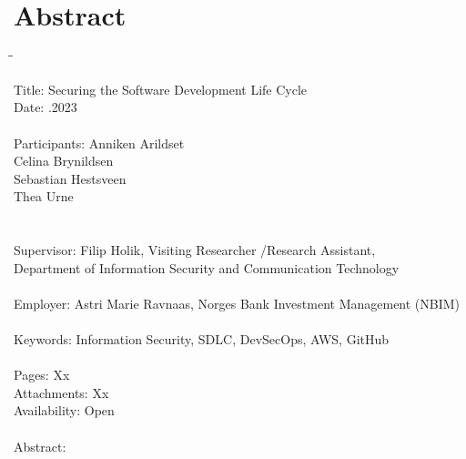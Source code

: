 
\chapter*{Abstract}

\begin{tabbing}
\hspace{2cm}\=\hspace{3cm}\=\kill %

Title: \> \> Securing the Software Development Life Cycle \\
Date: \> .2023 \\ 
\\
Participants: \> \> Anniken Arildset \\ \> \> Celina Brynildsen \\ \> \> Sebastian Hestsveen \\ \> \> Thea Urne \\
\\
\\
Supervisor: \> \> Filip Holik, Visiting Researcher /Research Assistant, \\\> \> Department of Information Security and Communication Technology \\
\\
Employer: \> \>  Astri Marie Ravnaas, Norges Bank Investment Management (NBIM) \\
\\
Keywords: \> \> Information Security, SDLC, DevSecOps, AWS, GitHub \\
\\
Pages: \> \> Xx \\
Attachments: \> \> Xx \\
Availability: \> \> Open \\
\\
Abstract: 



\end{tabbing}
